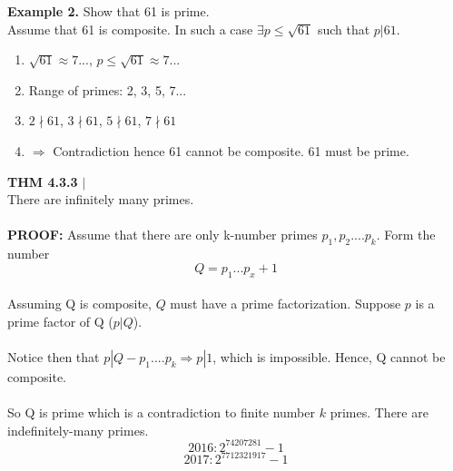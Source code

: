 \documentclass [12pt]{article}
\begin{document}
\noindent\textbf{Example 2.} Show that 61 is prime.\\
\vspace{0.1in}
\quad Assume that 61 is composite. In such a case $\exists p \leq \sqrt{61}$ such that $p|61$.
\begin{enumerate}[\quad]
    \item $\sqrt{61}\approx7...$, $p\leq\sqrt{61}\approx7...$
    \item Range of primes: 2, 3, 5, 7...
    \item $2\nmid61$, $3\nmid61$, $5\nmid61$, $7\nmid61$
    \item $\Rightarrow$ Contradiction hence 61 cannot be composite. 61 must be prime.
\end{enumerate}
\begin{framed}
\noindent\textbf{THM 4.3.3} $|$ \\
There are infinitely many primes.\\\\
\textbf{PROOF:} Assume that there are only k-number primes $p_1,p_2.... p_k$. Form the number\\
\[Q=p_1...p_x+1\]\\
Assuming Q is composite, $Q$ must have a prime factorization. Suppose $p$ is a prime factor of Q ($p|Q$).\\
\vspace{0.1cm}
\\
Notice then that $p|Q-p_1....p_k\Rightarrow p|1$, which is impossible. Hence, Q cannot be composite.\\
\vspace{0.1cm}
\\
So Q is prime which is a contradiction to finite number $k$ primes. There are indefinitely-many primes. 
\[2016: 2^{74207281}-1\]
\[2017: 2^{7712321917}-1\]
\end{framed}
\end{document}
